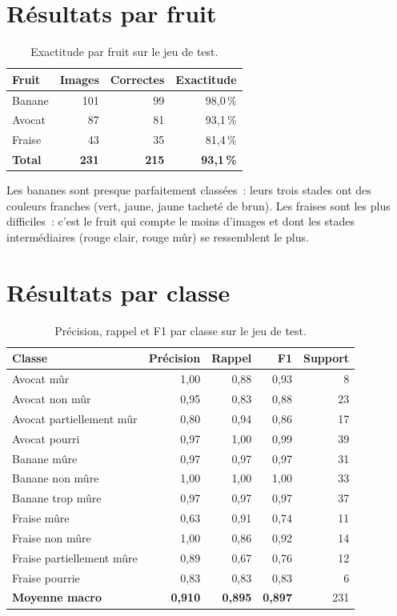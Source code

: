 \section{Résultats par fruit}

\begin{table}[H]
\centering
\caption{Exactitude par fruit sur le jeu de test.}\label{tab:fruit}
\small
\begin{tabular}{@{}lrrr@{}}
\toprule
\textbf{Fruit} & \textbf{Images} & \textbf{Correctes} & \textbf{Exactitude} \\
\midrule
Banane & 101 & 99 & 98,0\,\% \\
Avocat & 87 & 81 & 93,1\,\% \\
Fraise & 43 & 35 & 81,4\,\% \\
\midrule
\textbf{Total} & \textbf{231} & \textbf{215} & \textbf{93,1\,\%} \\
\bottomrule
\end{tabular}
\end{table}

Les bananes sont presque parfaitement classées~: leurs trois stades ont des couleurs franches (vert, jaune, jaune tacheté de brun). Les fraises sont les plus difficiles~: c’est le fruit qui compte le moins d’images et dont les stades intermédiaires (rouge clair, rouge mûr) se ressemblent le plus.

\section{Résultats par classe}

\begin{table}[H]
\centering
\caption{Précision, rappel et F1 par classe sur le jeu de test.}\label{tab:classe}
\small
\begin{tabular}{@{}lrrrr@{}}
\toprule
\textbf{Classe} & \textbf{Précision} & \textbf{Rappel} & \textbf{F1} & \textbf{Support} \\
\midrule
Avocat mûr & 1,00 & 0,88 & 0,93 & 8 \\
Avocat non mûr & 0,95 & 0,83 & 0,88 & 23 \\
Avocat partiellement mûr & 0,80 & 0,94 & 0,86 & 17 \\
Avocat pourri & 0,97 & 1,00 & 0,99 & 39 \\
Banane mûre & 0,97 & 0,97 & 0,97 & 31 \\
Banane non mûre & 1,00 & 1,00 & 1,00 & 33 \\
Banane trop mûre & 0,97 & 0,97 & 0,97 & 37 \\
Fraise mûre & 0,63 & 0,91 & 0,74 & 11 \\
Fraise non mûre & 1,00 & 0,86 & 0,92 & 14 \\
Fraise partiellement mûre & 0,89 & 0,67 & 0,76 & 12 \\
Fraise pourrie & 0,83 & 0,83 & 0,83 & 6 \\
\midrule
\textbf{Moyenne macro} & \textbf{0,910} & \textbf{0,895} & \textbf{0,897} & 231 \\
\bottomrule
\end{tabular}
\end{table}

